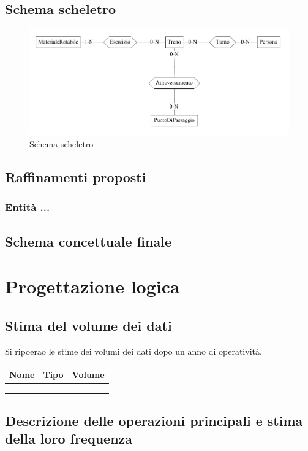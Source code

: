 \documentclass[a4paper,12pt]{report}
\begin{document}
	\section{Schema scheletro}
	\begin{figure}[h]
		\includegraphics[width=\linewidth]{res/schema/skel}
		\caption{Schema scheletro}
	\end{figure}
	\section{Raffinamenti proposti}
	\subsection{Entità ...}
	\section{Schema concettuale finale}
	\chapter{Progettazione logica}
	\section{Stima del volume dei dati}
	\par Si ripoerao le stime dei volumi dei dati dopo un anno di operatività.
	\begin{table}
	\centering
	\begin{tabular}{|l|l|l|}
		\hline
		Nome & Tipo & Volume \\
		\hline
		     &      &        \\
		\hline
		     &      &        \\
		\hline
		     &      &        \\
		\hline
	\end{tabular}
	\end{table}
	\section{Descrizione delle operazioni principali e stima della loro frequenza}
\end{document}
